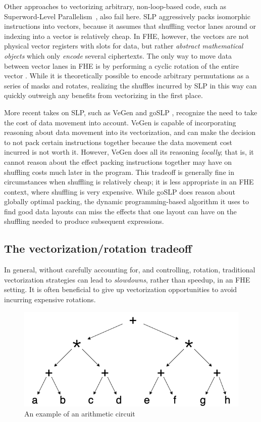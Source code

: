 Other approaches to vectorizing arbitrary, non-loop-based code, such as Superword-Level Parallelism~\cite{SLP}, also fail here.
SLP aggressively packs isomorphic instructions into vectors, because it assumes that shuffling vector lanes around or indexing into a vector is relatively cheap.
In FHE, however, the vectors are not physical vector registers with slots for data, but rather {\em abstract mathematical objects} which only {\em encode} several ciphertexts.
The only way to move data between vector lanes in FHE is by performing a cyclic rotation of the entire vector .
While it is theoretically possible to encode arbitrary permutations as a series of masks and rotates, realizing the shuffles incurred by SLP in this way can quickly outweigh any benefits from vectorizing in the first place. 

More recent takes on SLP, such as VeGen \cite{VeGen} and goSLP \cite{goSLP}, recognize the need to take the cost of data movement into account.
VeGen is capable of incorporating reasoning about data movement into its vectorization, and can make the decision to not pack certain instructions together because the data movement cost incurred is not worth it.
However, VeGen does all its reasoning {\em locally}; that is, it cannot reason about the effect packing instructions together may have on shuffling costs much later in the program. This tradeoff is generally fine in circumstances when shuffling is relatively cheap; it is less appropriate in an FHE context, where shuffling is very expensive.
While goSLP does reason about globally optimal packing, the dynamic programming-based algorithm it uses to find good data layouts can miss the effects that one layout can have on the shuffling needed to produce subsequent expressions. %

\subsection*{The vectorization/rotation tradeoff}

In general, without carefully accounting for, and controlling, rotation, traditional vectorization strategies can lead to {\em slowdowns}, rather than speedup, in an FHE setting. It is often beneficial to give up vectorization opportunities to avoid incurring expensive rotations.

\begin{figure}
    \includegraphics[width=0.6\linewidth]{figures/compilation_overview/coyote_running_example.drawio.png}
    \caption{An example of an arithmetic circuit}\label{fig:example-circuit}
\end{figure}

